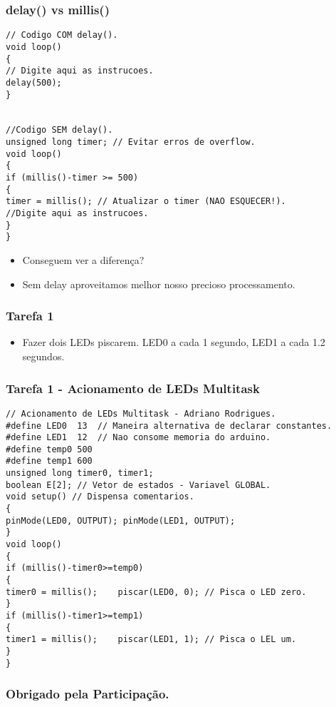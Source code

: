 \documentclass{beamer}
\begin{document}
\begin{frame}[fragile]
	\frametitle{\textbf{delay()} vs \textbf{millis()}}
\begin{lstlisting}[style=Arduino,basicstyle=\scriptsize \ttfamily]
// Codigo COM delay().
void loop()
{
// Digite aqui as instrucoes.
delay(500);
}


//Codigo SEM delay().
unsigned long timer; // Evitar erros de overflow.
void loop()
{
if (millis()-timer >= 500)
{
timer = millis(); // Atualizar o timer (NAO ESQUECER!).
//Digite aqui as instrucoes.
}
}
\end{lstlisting}
	\begin{itemize}
	\item<1-> Conseguem ver a diferença?
	\item<2-> Sem delay aproveitamos melhor nosso precioso processamento.
	\end{itemize}
\end{frame}

\begin{frame}
	\frametitle{Tarefa 1}
	\begin{itemize}
	\item Fazer dois LEDs piscarem. LED0 a cada 1 segundo, LED1 a cada 1.2 segundos.
	\end{itemize}
\end{frame}

\begin{frame}[fragile]
	\frametitle{Tarefa 1 - Acionamento de LEDs Multitask}
	\begin{lstlisting}[style=Arduino,basicstyle=\scriptsize \ttfamily]
// Acionamento de LEDs Multitask - Adriano Rodrigues.
#define LED0  13  // Maneira alternativa de declarar constantes.
#define LED1  12  // Nao consome memoria do arduino.
#define temp0 500
#define temp1 600
unsigned long timer0, timer1;
boolean E[2]; // Vetor de estados - Variavel GLOBAL.
void setup() // Dispensa comentarios.
{
pinMode(LED0, OUTPUT); pinMode(LED1, OUTPUT);
}
void loop()
{
if (millis()-timer0>=temp0)
{
timer0 = millis();    piscar(LED0, 0); // Pisca o LED zero.
}
if (millis()-timer1>=temp1)
{
timer1 = millis();    piscar(LED1, 1); // Pisca o LEL um.
}
}
\end{lstlisting}
\end{frame}

\begin{frame}
	\frametitle{Obrigado pela Participação.}
	\titlepage
\end{frame}
\end{document}
